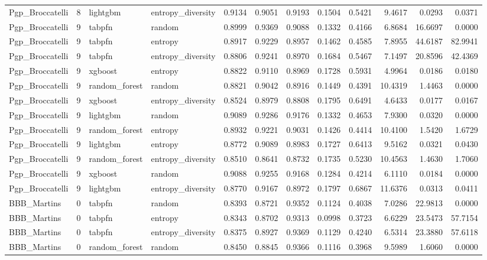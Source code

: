 \begin{tabular}{lrllrrrrrrrr}
Pgp_Broccatelli & 8 & lightgbm & entropy_diversity & 0.9134 & 0.9051 & 0.9193 & 0.1504 & 0.5421 & 9.4617 & 0.0293 & 0.0371 \\
Pgp_Broccatelli & 9 & tabpfn & random & 0.8999 & 0.9369 & 0.9088 & 0.1332 & 0.4166 & 6.8684 & 16.6697 & 0.0000 \\
Pgp_Broccatelli & 9 & tabpfn & entropy & 0.8917 & 0.9229 & 0.8957 & 0.1462 & 0.4585 & 7.8955 & 44.6187 & 82.9941 \\
Pgp_Broccatelli & 9 & tabpfn & entropy_diversity & 0.8806 & 0.9241 & 0.8970 & 0.1684 & 0.5467 & 7.1497 & 20.8596 & 42.4369 \\
Pgp_Broccatelli & 9 & xgboost & entropy & 0.8822 & 0.9110 & 0.8969 & 0.1728 & 0.5931 & 4.9964 & 0.0186 & 0.0180 \\
Pgp_Broccatelli & 9 & random_forest & random & 0.8821 & 0.9042 & 0.8916 & 0.1449 & 0.4391 & 10.4319 & 1.4463 & 0.0000 \\
Pgp_Broccatelli & 9 & xgboost & entropy_diversity & 0.8524 & 0.8979 & 0.8808 & 0.1795 & 0.6491 & 4.6433 & 0.0177 & 0.0167 \\
Pgp_Broccatelli & 9 & lightgbm & random & 0.9089 & 0.9286 & 0.9176 & 0.1332 & 0.4653 & 7.9300 & 0.0320 & 0.0000 \\
Pgp_Broccatelli & 9 & random_forest & entropy & 0.8932 & 0.9221 & 0.9031 & 0.1426 & 0.4414 & 10.4100 & 1.5420 & 1.6729 \\
Pgp_Broccatelli & 9 & lightgbm & entropy & 0.8772 & 0.9089 & 0.8983 & 0.1727 & 0.6413 & 9.5162 & 0.0321 & 0.0430 \\
Pgp_Broccatelli & 9 & random_forest & entropy_diversity & 0.8510 & 0.8641 & 0.8732 & 0.1735 & 0.5230 & 10.4563 & 1.4630 & 1.7060 \\
Pgp_Broccatelli & 9 & xgboost & random & 0.9088 & 0.9255 & 0.9168 & 0.1284 & 0.4214 & 6.1110 & 0.0184 & 0.0000 \\
Pgp_Broccatelli & 9 & lightgbm & entropy_diversity & 0.8770 & 0.9167 & 0.8972 & 0.1797 & 0.6867 & 11.6376 & 0.0313 & 0.0411 \\
BBB_Martins & 0 & tabpfn & random & 0.8393 & 0.8721 & 0.9352 & 0.1124 & 0.4038 & 7.0286 & 22.9813 & 0.0000 \\
BBB_Martins & 0 & tabpfn & entropy & 0.8343 & 0.8702 & 0.9313 & 0.0998 & 0.3723 & 6.6229 & 23.5473 & 57.7154 \\
BBB_Martins & 0 & tabpfn & entropy_diversity & 0.8375 & 0.8927 & 0.9369 & 0.1129 & 0.4240 & 6.5314 & 23.3880 & 57.6118 \\
BBB_Martins & 0 & random_forest & random & 0.8450 & 0.8845 & 0.9366 & 0.1116 & 0.3968 & 9.5989 & 1.6060 & 0.0000 \\

\end{tabular}
